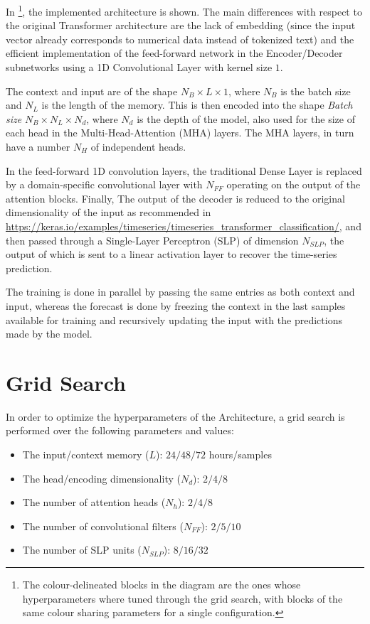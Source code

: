 \documentclass{scrartcl}
\begin{document}
    In \footnote{The colour-delineated blocks in the diagram are the ones whose hyperparameters where tuned through the grid search, with blocks of the same colour sharing parameters for a single configuration.}, the implemented architecture is shown. The main differences with respect to the original Transformer architecture are the lack of embedding (since the input vector already corresponds to numerical data instead of tokenized text) and the efficient implementation of the feed-forward network in the Encoder/Decoder subnetworks using a 1D Convolutional Layer with kernel size $1$.

    The context and input are of the shape $N_B \times L \times 1$, where $N_B$ is the batch size and $N_L$ is the length of the memory. This is then encoded into the shape \textit{Batch size} $N_B \times N_L \times N_d$, where $N_d$ is the depth of the model, also used for the size of each head in the Multi-Head-Attention (MHA) layers. The MHA layers, in turn have a number $N_H$ of independent heads.

    In the feed-forward 1D convolution layers, the traditional Dense Layer is replaced by a domain-specific convolutional layer with $N_{FF}$ operating on the output of the attention blocks. Finally, The output of the decoder is reduced to the original dimensionality of the input as recommended in \url{https://keras.io/examples/timeseries/timeseries_transformer_classification/}, and then passed through a Single-Layer Perceptron (SLP) of dimension $N_{SLP}$, the output of which is sent to a linear activation layer to recover the time-series prediction.

    The training is done in parallel by passing the same entries as both context and input, whereas the forecast is done by freezing the context in the last samples available for training and recursively updating the input with the predictions made by the model.

  \section{Grid Search}

    In order to optimize the hyperparameters of the Architecture, a grid search is performed over the following parameters and values:
    \begin{itemize}
      \item The input/context memory ($L$): $24/48/72$ hours/samples
      \item The head/encoding dimensionality ($N_d$): $2/4/8$
      \item The number of attention heads ($N_h$): $2/4/8$
      \item The number of convolutional filters ($N_{FF}$): $2/5/10$
      \item The number of SLP units ($N_{SLP}$): $8/16/32$
    \end{itemize}
\end{document}
